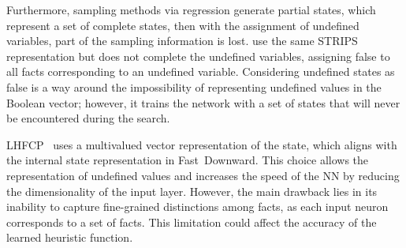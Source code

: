 Furthermore, sampling methods via regression generate partial states, which represent a set of complete states, then with the assignment of undefined variables, part of the sampling information is lost. \citet{yu2020learning} use the same STRIPS representation but does not complete the undefined variables, assigning false to all facts corresponding to an undefined variable. Considering undefined states as false is a way around the impossibility of representing undefined values in the Boolean vector; however, it trains the network with a set of states that will never be encountered during the search.

LHFCP~\cite{geissmann2015learning} uses a multivalued \sas vector representation of the state, which aligns with the internal state representation in Fast~Downward. This choice allows the representation of undefined values and increases the speed of the NN by reducing the dimensionality of the input layer. However, the main drawback lies in its inability to capture fine-grained distinctions among facts, as each input neuron corresponds to a set of facts. This limitation could affect the accuracy of the learned heuristic function.
